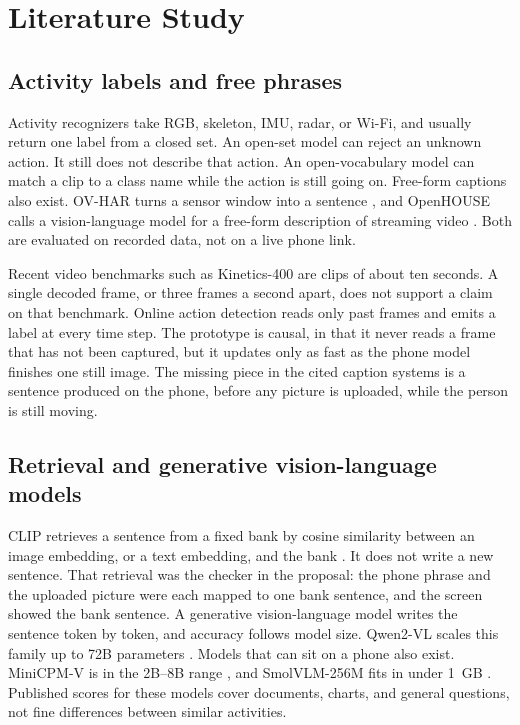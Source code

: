 \section{Literature Study}
\label{sec:literature}

\subsection{Activity labels and free phrases}

Activity recognizers take RGB, skeleton, IMU, radar, or Wi-Fi, and usually
return one label from a closed set. An open-set model can reject an unknown
action. It still does not describe that action. An open-vocabulary model
can match a clip to a class name while the action is still going on.
Free-form captions also exist. OV-HAR turns a sensor window into a sentence
\cite{ray2025ovhar}, and OpenHOUSE calls a vision-language model for a
free-form description of streaming video \cite{kang2025openhouse}. Both are
evaluated on recorded data, not on a live phone link.

Recent video benchmarks such as Kinetics-400 are clips of about ten
seconds. A single decoded frame, or three frames a second apart, does not
support a claim on that benchmark. Online action detection reads only past
frames and emits a label at every time step. The prototype is causal, in
that it never reads a frame that has not been captured, but it updates only
as fast as the phone model finishes one still image. The missing piece in
the cited caption systems is a sentence produced on the phone, before any
picture is uploaded, while the person is still moving.

\subsection{Retrieval and generative vision-language models}

CLIP retrieves a sentence from a fixed bank by cosine similarity between an
image embedding, or a text embedding, and the bank
\cite{radford2021learning}. It does not write a new sentence. That
retrieval was the checker in the proposal: the phone phrase and the
uploaded picture were each mapped to one bank sentence, and the screen
showed the bank sentence. A generative vision-language model writes the
sentence token by token, and accuracy follows model size. Qwen2-VL scales
this family up to 72B parameters \cite{wang2024qwen2vl}. Models that can
sit on a phone also exist. MiniCPM-V is in the 2B--8B range
\cite{yao2024minicpm}, and SmolVLM-256M fits in under 1~GB
\cite{marafioti2025smolvlm}. Published scores for these models cover
documents, charts, and general questions, not fine differences between
similar activities.


